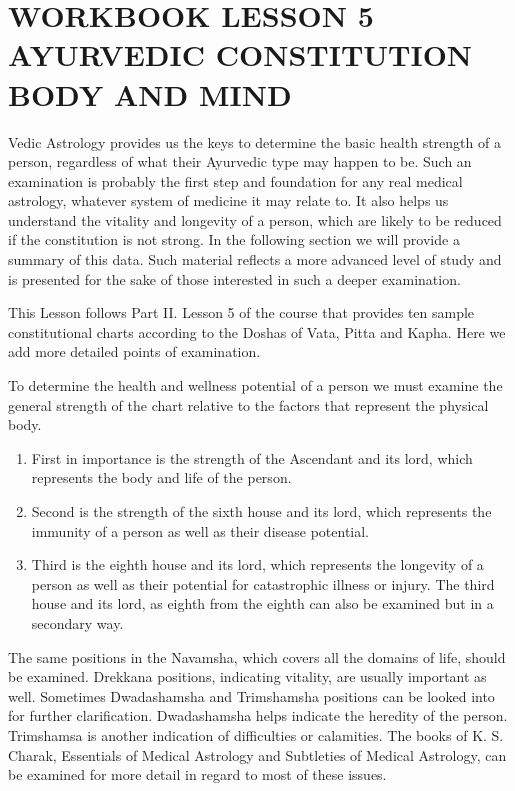 \section{WORKBOOK LESSON 5
AYURVEDIC CONSTITUTION
BODY AND MIND}
 

Vedic Astrology provides us the keys to determine the basic health strength of a person, regardless of what their Ayurvedic type may happen to be. Such an examination is probably the first step and foundation for any real medical astrology, whatever system of medicine it may relate to. It also helps us understand the vitality and longevity of a person, which are likely to be reduced if the constitution is not strong. In the following section we will provide a summary of this data. Such material reflects a more advanced level of study and is presented for the sake of those interested in such a deeper examination.

 

This Lesson follows Part II. Lesson 5 of the course that provides ten sample constitutional charts according to the Doshas of Vata, Pitta and Kapha. Here we add more detailed points of examination.

 

To determine the health and wellness potential of a person we must examine the general strength of the chart relative to the factors that represent the physical body.

 
\begin{enumerate}
\item First in importance is the strength of the Ascendant and its lord, which represents the body and life of the person.
\item Second is the strength of the sixth house and its lord, which represents the immunity of a person as well as their disease potential.
\item Third is the eighth house and its lord, which represents the longevity of a person as well as their potential for catastrophic illness or injury. The third house and its lord, as eighth from the eighth can also be examined but in a secondary way.
\end{enumerate}
 

The same positions in the Navamsha, which covers all the domains of life, should be examined. Drekkana positions, indicating vitality, are usually important as well. Sometimes Dwadashamsha and Trimshamsha positions can be looked into for further clarification. Dwadashamsha helps indicate the heredity of the person. Trimshamsa is another indication of difficulties or calamities. The books of  K. S. Charak, Essentials of Medical Astrology and Subtleties of Medical Astrology, can be examined for more detail in regard to most of these issues.




